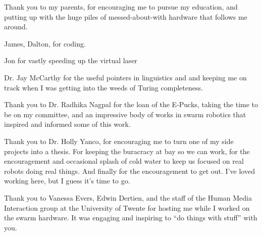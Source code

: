 Thank you to my parents, for encouraging me to pursue my education, and putting up with the huge piles of messed-about-with hardware that follows me around. 

James, Dalton, for coding. 

Jon for vastly speeding up the virtual laser

Dr. Jay McCarthy for the useful pointers in linguistics and  and keeping me on track when I was getting into the weeds of Turing completeness. 

Thank you to Dr. Radhika Nagpal for the loan of the E-Pucks, taking the time to be on my committee, and an impressive body of works in swarm robotics that inspired and informed some of this work. 

Thank you to Dr. Holly Yanco, for encouraging me to turn one of my side projects into a thesis. For keeping the buracracy at bay so we can work, for the encouragement and occasional splash of cold water to keep us focused on real robots doing real things. And finally for the encouragement to get out. I've loved working here, but I guess it's time to go.   

Thank you to Vanessa Evers, Edwin Dertien, and the staff of the Human Media Interaction group at the University of Twente for hosting me while I worked on the swarm hardware. It was engaging and inspiring to ``do things with stuff'' with you. 
